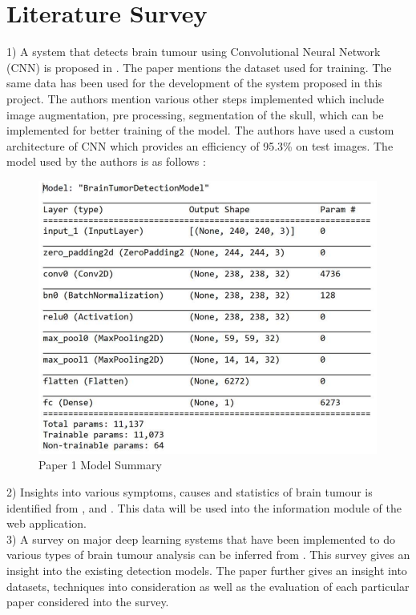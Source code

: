 \chapter{Literature Survey}

1) A system that detects brain tumour using Convolutional Neural Network (CNN) is proposed in \cite{ref1}. The paper mentions the dataset used for training. The same data has been used for the development of the system proposed in this project. The authors mention various other steps implemented which include image augmentation, pre processing, segmentation of the skull, which can be implemented for better training of the model. The authors have used a custom architecture of CNN which provides an efficiency of 95.3\% on test images. The model used by the authors is as follows : 
\begin{figure}[H]
\includegraphics[scale=1]{Photos/paper1_model.PNG}
\caption{Paper 1 Model Summary} \label{fig:ishan}
\end{figure}

2) Insights into various symptoms, causes and statistics of brain tumour is identified from \cite{ref2} , \cite{ref3} and \cite{ref5}. This data will be used into the information module of the web application.\\ 

3) A survey on major deep learning systems that have been implemented to do various types of brain tumour analysis can be inferred from \cite{ref4}. This survey gives an insight into the existing detection models. The paper further gives an insight into datasets, techniques into consideration as well as the evaluation of each particular paper considered into the survey.\\

